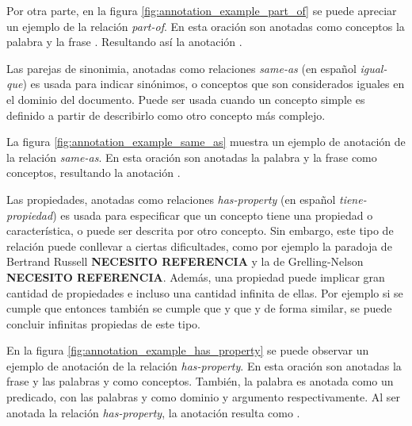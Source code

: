 Por otra parte, en la figura \ref{fig:annotation_example_part_of} se puede apreciar un ejemplo de la relación {\it part-of}. En esta oración son anotadas como conceptos la palabra  y la frase . Resultando así la anotación .

Las parejas de sinonimia, anotadas como relaciones {\it same-as} (en español {\it igual-que}) es usada para indicar sinónimos, o conceptos que son considerados iguales en el dominio del documento. Puede ser usada cuando un concepto simple es definido a partir de describirlo como otro concepto más complejo.

La figura \ref{fig:annotation_example_same_as} muestra un ejemplo de anotación de la relación {\it same-as}. En esta oración son anotadas la palabra  y la frase  como conceptos, resultando la anotación .

Las propiedades, anotadas como relaciones {\it has-property} (en español {\it tiene-propiedad}) es usada para especificar que un concepto tiene una propiedad o característica, o puede ser descrita por otro concepto. Sin embargo, este tipo de relación puede conllevar a ciertas dificultades, como por ejemplo la paradoja de Bertrand Russell \textbf{NECESITO REFERENCIA} y la de Grelling-Nelson \textbf{NECESITO REFERENCIA}. Además, una propiedad puede implicar gran cantidad de propiedades e incluso una cantidad infinita de ellas. Por ejemplo si se cumple que  entonces también se cumple que  y que  y de forma similar, se puede concluir infinitas propiedas de este tipo.

En la figura \ref{fig:annotation_example_has_property} se puede observar un ejemplo de anotación de la relación {\it has-property}. En esta oración son anotadas la frase  y las palabras  y  como conceptos. También, la palabra  es anotada como un predicado, con las palabras  y  como dominio y argumento respectivamente. Al ser anotada la relación {\it has-property}, la anotación resulta como .

